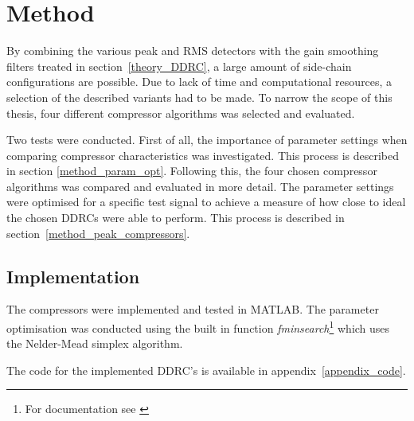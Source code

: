 \documentclass[../main2.tex]{subfiles}
\providecommand{\rootdir}{..}
\begin{document}
\section{Method}\label{method}
By combining the various peak and RMS detectors with the gain smoothing filters treated in section~\ref{theory_DDRC}, a large amount of side-chain configurations are possible. Due to lack of time and computational resources, a selection of the described variants had to be made. To narrow the scope of this thesis, four different compressor algorithms was selected and evaluated.

Two tests were conducted. First of all, the importance of parameter settings when comparing compressor characteristics was investigated. This process is described in section \ref{method_param_opt}. Following this, the four chosen compressor algorithms was compared and evaluated in more detail. The parameter settings were optimised for a specific test signal to achieve a measure of how close to ideal the chosen DDRCs were able to perform. This process is described in section~\ref{method_peak_compressors}.

\subsection{Implementation} \label{method_implementation}
The compressors were implemented and tested in MATLAB\textsuperscript{\textregistered}. The parameter optimisation was conducted using the built in function \emph{fminsearch}\footnote{For documentation see \cite{fminsearch}} which uses the Nelder-Mead simplex algorithm. 

The code for the implemented DDRC's is available in appendix~\ref{appendix_code}.



\end{document}
